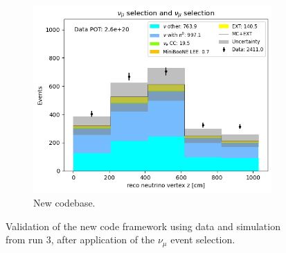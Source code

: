 \begin{figure}[H]
\begin{subfigure}[t]{0.32\linewidth}
        \includegraphics[width=\linewidth]{technote/Appendix_Validation/Figures/Numu/Run3_Vertex_Z_Alex.png}
        \caption{New codebase.}
    \end{subfigure}
    \caption{Validation of the new code framework using data and simulation from run 3, after application of the $\nu_{\mu}$ event selection.}
\end{figure}
